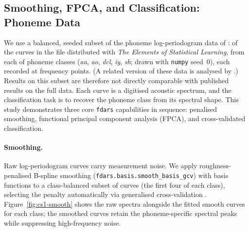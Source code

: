 

\subsection{Smoothing, FPCA, and Classification: Phoneme Data}
\label{subsec:cs1-phoneme}

We use a balanced, seeded subset of the phoneme log-periodogram data of
\citet{hastie_buja_tibshirani_1995}: \csOneNCurves{} of the \csOneNFull{} curves
in the file distributed with \emph{The Elements of Statistical Learning},
\csOneNPerClass{} from each of \csOneNClasses{} phoneme classes (\textit{aa},
\textit{ao}, \textit{dcl}, \textit{iy}, \textit{sh}; drawn with \texttt{numpy}
seed~0), each recorded at \csOneNPoints{} frequency points.  (A related version
of these data is analysed by \citet{ferraty_vieu_2006}.)  Results on this
subset are therefore not directly comparable with published results on the
full data.  Each curve is a digitised acoustic spectrum, and the
classification task is to recover the phoneme class from its spectral shape.
This study demonstrates three core \texttt{fdars} capabilities in sequence:
penalised smoothing, functional principal component analysis (FPCA), and
cross-validated classification.

\paragraph{Smoothing.}
Raw log-periodogram curves carry measurement noise.  We apply roughness-penalised
B-spline smoothing (\texttt{fdars.basis.smooth\_basis\_gcv}) with
\csOneSmoothNBasis{} basis functions to a class-balanced subset of
\csOneSmoothN{} curves (the first four of each class), selecting the penalty automatically via generalised
cross-validation \citep{craven_wahba_1979,ramsay_silverman_2005}.
Figure~\ref{fig:cs1-smooth} shows the raw spectra alongside the fitted smooth
curves for each class; the smoothed curves retain the phoneme-specific spectral
peaks while suppressing high-frequency noise.

